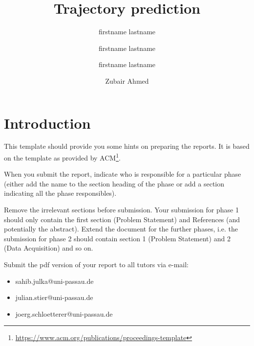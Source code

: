 \documentclass[sigconf]{acmart}
\begin{document}
\title{Trajectory prediction}

\author{firstname lastname}
\affiliation{\institution{}}
  
\author{firstname lastname}
\affiliation{\institution{}}
  
\author{firstname lastname}
\affiliation{\institution{}}
  
\author{Zubair Ahmed}
\affiliation{\institution{}}

\renewcommand{\shortauthors}{Topic 3}

\begin{abstract}
\end{abstract}


\maketitle
\section*{Introduction}
This template should provide you some hints on preparing the reports. 
It is based on the template as provided by ACM\footnote{\url{https://www.acm.org/publications/proceedings-template}}.

When you submit the report, indicate who is responsible for a particular phase (either add the name to the section heading of the phase or add a section indicating all the phase responsibles).

Remove the irrelevant sections before submission.
Your submission for phase 1 should only contain the first section (Problem Statement) and References (and potentially the abstract).
Extend the document for the further phases, i.e. the submission for phase 2 should contain section 1 (Problem Statement) and 2 (Data Acquisition) and so on.

Submit the pdf version of your report to all tutors via e-mail:
\begin{itemize}
 \item sahib.julka@uni-passau.de
 \item julian.stier@uni-passau.de
 \item joerg.schloetterer@uni-passau.de
\end{itemize}
\end{document}
